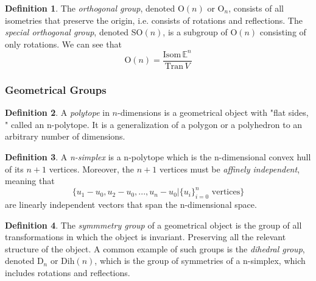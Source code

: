 \documentclass{article}
\theoremstyle{remark}
\theoremstyle{definition}
\newtheorem{definition}{Definition}[section]
\begin{document}
\begin{definition}
The \textit{orthogonal group}, denoted O$(n)$ or O$_{n}$, consists of all isometries that preserve the origin, i.e. consists of rotations and reflections. The \textit{special orthogonal group}, denoted SO$(n)$, is a subgroup of O$(n)$ consisting of only rotations. We can see that 
\[\text{O}(n)=\frac{\text{Isom}\, \mathbb{E}^{n}}{\text{Tran}\,V} \]
\end{definition}

\subsubsection{Geometrical Groups}

\begin{definition}
A \textit{polytope} in $n$-dimensions is a geometrical object with "flat sides, " called an n-polytope. It is a generalization of a polygon or a polyhedron to an arbitrary number of dimensions. 
\end{definition}

\begin{definition}
A \textit{n-simplex} is a n-polytope which is the n-dimensional convex hull of its $n+1$ vertices. Moreover, the $n+1$ vertices must be \textit{affinely independent}, meaning that
\[ \{u_1 - u_0, u_2 - u_0, ..., u_n - u_0 | \{u_i\}_{i=0}^{n} \text{ vertices} \} \]
are linearly independent vectors that span the n-dimensional space. 
\end{definition}

\begin{definition}
The \textit{symmmetry group} of a geometrical object is the group of all transformations in which the object is invariant. Preserving all the relevant structure of the object. A common example of such groups is the \textit{dihedral group}, denoted D$_{n}$ or Dih$(n)$, which is the group of symmetries of a n-simplex, which includes rotations and reflections. 
\end{definition}
\end{document}
